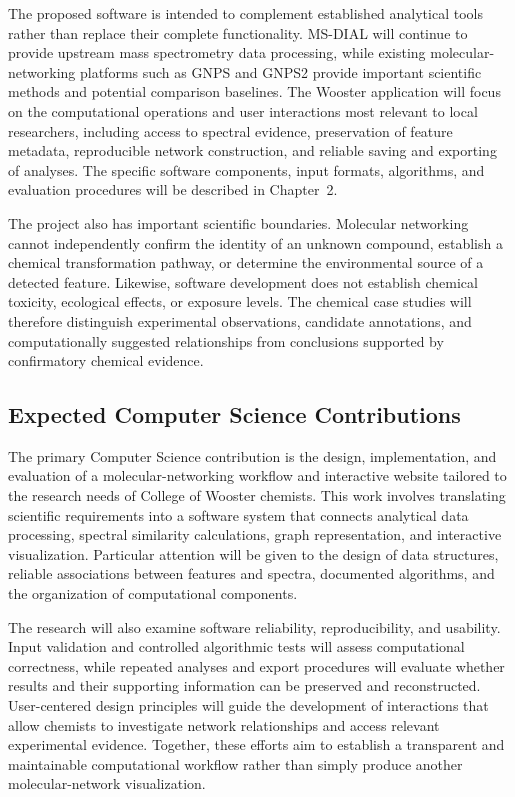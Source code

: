         The proposed software is intended to complement established analytical tools rather than replace their complete functionality. MS-DIAL will continue to provide upstream mass spectrometry data processing, while existing molecular-networking platforms such as GNPS and GNPS2 provide important scientific methods and potential comparison baselines. The Wooster application will focus on the computational operations and user interactions most relevant to local researchers, including access to spectral evidence, preservation of feature metadata, reproducible network construction, and reliable saving and exporting of analyses. The specific software components, input formats, algorithms, and evaluation procedures will be described in Chapter~2.

        The project also has important scientific boundaries. Molecular networking cannot independently confirm the identity of an unknown compound, establish a chemical transformation pathway, or determine the environmental source of a detected feature. Likewise, software development does not establish chemical toxicity, ecological effects, or exposure levels. The chemical case studies will therefore distinguish experimental observations, candidate annotations, and computationally suggested relationships from conclusions supported by confirmatory chemical evidence.

    \subsection{Expected Computer Science Contributions}\label{subsec:cs-contributions}

        The primary Computer Science contribution is the design, implementation, and evaluation of a molecular-networking workflow and interactive website tailored to the research needs of College of Wooster chemists. This work involves translating scientific requirements into a software system that connects analytical data processing, spectral similarity calculations, graph representation, and interactive visualization. Particular attention will be given to the design of data structures, reliable associations between features and spectra, documented algorithms, and the organization of computational components.

        The research will also examine software reliability, reproducibility, and usability. Input validation and controlled algorithmic tests will assess computational correctness, while repeated analyses and export procedures will evaluate whether results and their supporting information can be preserved and reconstructed. User-centered design principles will guide the development of interactions that allow chemists to investigate network relationships and access relevant experimental evidence. Together, these efforts aim to establish a transparent and maintainable computational workflow rather than simply produce another molecular-network visualization.

